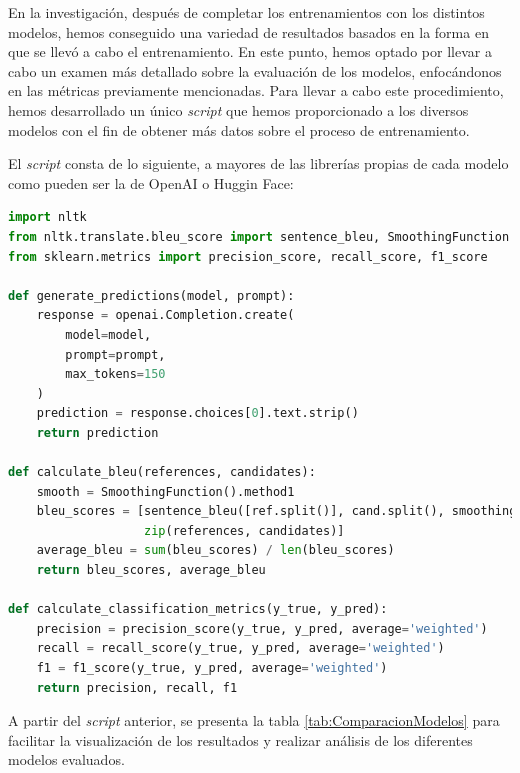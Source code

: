 \bigskip %

En la investigación, después de completar los entrenamientos con los distintos modelos, hemos conseguido una variedad de resultados basados en la forma en que se llevó a cabo el entrenamiento. En este punto, hemos optado por llevar a cabo un examen más detallado sobre la evaluación de los modelos, enfocándonos en las métricas previamente mencionadas. Para llevar a cabo este procedimiento, hemos desarrollado un único \textit{script} que hemos proporcionado a los diversos modelos con el fin de obtener más datos sobre el proceso de entrenamiento.

\bigskip %

El \textit{script} consta de lo siguiente, a mayores de las librerías propias de cada modelo como pueden ser la de OpenAI o Huggin Face:

\bigskip %

\begin{lstlisting}[language=Python, caption={Script de evaluación del modelo.}, label=listado10]
import nltk
from nltk.translate.bleu_score import sentence_bleu, SmoothingFunction
from sklearn.metrics import precision_score, recall_score, f1_score

def generate_predictions(model, prompt):
    response = openai.Completion.create(
        model=model,
        prompt=prompt,
        max_tokens=150
    )
    prediction = response.choices[0].text.strip()
    return prediction

def calculate_bleu(references, candidates):
    smooth = SmoothingFunction().method1
    bleu_scores = [sentence_bleu([ref.split()], cand.split(), smoothing_function=smooth) for ref, cand in
                   zip(references, candidates)]
    average_bleu = sum(bleu_scores) / len(bleu_scores)
    return bleu_scores, average_bleu

def calculate_classification_metrics(y_true, y_pred):
    precision = precision_score(y_true, y_pred, average='weighted')
    recall = recall_score(y_true, y_pred, average='weighted')
    f1 = f1_score(y_true, y_pred, average='weighted')
    return precision, recall, f1

\end{lstlisting}

\bigskip %

A partir del \textit{script} anterior, se presenta la tabla \ref{tab:ComparacionModelos} para facilitar la visualización de los resultados y realizar análisis de los diferentes modelos evaluados.

